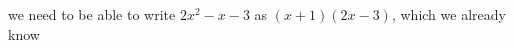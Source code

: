       \label{m39247*id149590}we need to be able to write $2{x}^{2}-x-3$ as $\left(x+1\right)\left(2x-3\right)$, which we already know
%             
%         
%       
% 
      \label{m39247*uid36}
